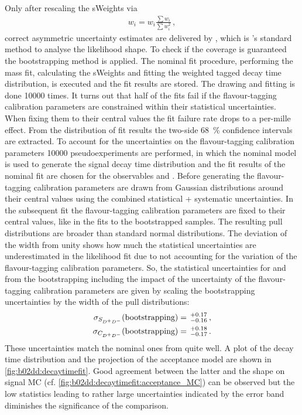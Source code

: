 Only after rescaling the sWeights via
\begin{align}
  w_i = w_i \frac{\sum w_i}{\sum w_i^2}\,,
\end{align}
correct asymmetric uncertainty estimates are delivered by \minos, which is
\root's standard method to analyse the likelihood shape. To check if the
coverage is guaranteed the bootstrapping method is applied. The nominal fit
procedure, \ie performing the mass fit, calculating the sWeights and fitting
the weighted tagged decay time distribution, is executed and the fit results
are stored. The drawing and fitting is done \num{10000} times. It turns out
that half of the fits fail if the flavour-tagging calibration parameters are
constrained within their statistical uncertainties. When fixing them to their
central values the fit failure rate drops to a per-mille effect. From the
distribution of fit results the two-side \SI{68}{\percent} confidence
intervals are extracted. To account for the uncertainties on the
flavour-tagging calibration parameters \num{10000} pseudoexperiments are
performed, in which the nominal model is used to generate the signal decay
time distribution and the fit results of the nominal fit are chosen for the
\CP observables \SDD and \CDD. Before generating the flavour-tagging
calibration parameters are drawn from Gaussian distributions around their
central values using the combined statistical + systematic uncertainties. In
the subsequent fit the flavour-tagging calibration parameters are fixed to
their central values, like in the fits to the bootstrapped samples. The
resulting pull distributions are broader than standard normal distributions.
The deviation of the width from unity shows how much the statistical
uncertainties are underestimated in the likelihood fit due to not accounting
for the variation of the flavour-tagging calibration parameters. So, the
statistical uncertainties for \SDD and \CDD from the bootstrapping including
the impact of the uncertainty of the flavour-tagging calibration parameters
are given by scaling the bootstrapping uncertainties by the width of the pull
distributions:
\begin{align}
    \sigma_{S_{{{D}^+}{{D}^-}}}(\text{bootstrapping}) &= \,^{+0.17}_{-0.16} \,, \\
    \sigma_{C_{{{D}^+}{{D}^-}}}(\text{bootstrapping}) &= \,^{+0.18}_{-0.17} \,.
\end{align}
These uncertainties match the nominal ones from \minos quite well. A plot of
the decay time distribution and the projection of the acceptance model are
shown in \cref{fig:b02dd:decaytimefit}. Good agreement between the latter and
the shape on signal MC (cf. \cref{fig:b02dd:decaytimefit:acceptance_MC}) can
be observed but the low statistics leading to rather large uncertainties
indicated by the error band diminishes the significance of the comparison.

